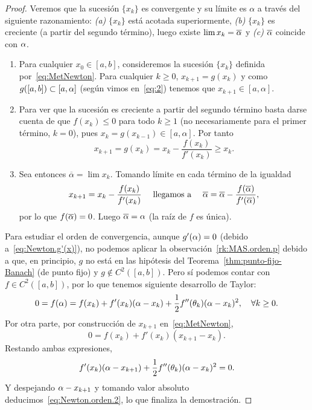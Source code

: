 \begin{proof}
  Veremos que la sucesión $\{x_k\}$ es convergente y su límite es
  $\alpha$ a través del siguiente razonamiento: \textit{(a)} $\{x_k\}$
  está acotada superiormente, \textit{(b)} $\{x_k\}$ es creciente (a
  partir del segundo término), luego existe $\lim x_k=\overline{\alpha}$
  y \textit{(c)} $\overline{\alpha}$ coincide con $\alpha$.
  \begin{enumerate}[label=\emph{(\alph*)}]
  \item Para cualquier $x_0\in[a,b]$, consideremos la sucesión
    $\{x_k\}$ definida por~\eqref{eq:MetNewton}. Para cualquier $k\ge
    0$, $x_{k+1}=g(x_{k})$ y como $g([a,b])\subset [a,\alpha]$
    (según vimos en~\eqref{eq:2}) tenemos que
    $x_{k+1}\in [a,\alpha]$.
  \item Para ver que la sucesión es creciente a partir del segundo
    término basta darse cuenta de que $f(x_k)\le 0$ para todo $k\ge 1$
    (no necesariamente para el primer término, $k=0$), pues $x_k=g(x_{k-1})\in
    [a,\alpha]$. Por tanto
    $$
    x_{k+1}=g(x_k)=x_k - \frac{f(x_k)}{f'(x_k)} \ge x_k.
    $$
  \item Sea entonces $\overline\alpha = \lim x_k$. Tomando límite en cada
    término de la igualdad
    \begin{equation*}
      x_{k+1}=x_k- \frac{f(x_k)}{f'(x_k)}
    \quad\text{ llegamos a }\quad
      \overline{\alpha} = \overline{\alpha} -
      \frac{f(\overline{\alpha})}{f'(\overline{\alpha})},
    \end{equation*}
    por lo que $f(\overline{\alpha})=0$. Luego $\overline{\alpha}=\alpha$ (la
    raíz de $f$ es única).
  \end{enumerate}

  Para estudiar el orden de convergencia, aunque $g'(\alpha)=0$ (debido
  a~\eqref{eq:Newton.g'(x)}), no podemos aplicar la
  observación~\ref{rk:MAS.orden.p} debido a que, en principio, $g$ no
  está en las hipótesis del Teorema~\ref{thm:punto-fijo-Banach} (de
  punto fijo) y $g\not\in C^2([a,b])$. Pero sí podemos contar con
  $f\in C^2([a,b])$, por lo que tenemos siguiente desarrollo de
  Taylor:
  \begin{equation*}
    0 = f(\alpha)=f(x_k)+f'(x_k)(\alpha-x_k)+\frac12 f''(\theta_k)(\alpha-x_k)^2,
    \quad\forall k\ge 0.
  \end{equation*}
  Por otra parte, por construcción de $x_{k+1}$ en~\eqref{eq:MetNewton},
  \begin{equation*}
    0=f(x_k)+f'(x_k)(x_{k+1}-x_k).
  \end{equation*}
  Restando ambas expresiones,
  \begin{equation*}
    f'(x_k)(\alpha-x_{k+1}) + \frac12 f''(\theta_k)(\alpha-x_k)^2 = 0.
  \end{equation*}
  Y despejando $\alpha-x_{k+1}$ y tomando valor absoluto
  deducimos~\eqref{eq:Newton.orden.2}, lo que finaliza la demostración.
\end{proof}

